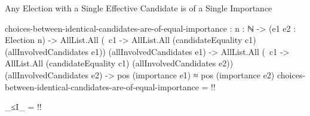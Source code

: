 \documentclass{beamer}
\begin{document}
\begin{frame}{Any Election with a Single Effective Candidate is of a Single Importance}
\begin{code}
choices-between-identical-candidates-are-of-equal-importance :
  {n : ℕ} ->
  (e1 e2 : Election {n}) ->
  AllList.All (\ c1 -> AllList.All (candidateEquality c1)
                                   (allInvolvedCandidates e1))
              (allInvolvedCandidates e1) ->
  AllList.All (\ c1 -> AllList.All (candidateEquality c1)
                                   (allInvolvedCandidates e2))
              (allInvolvedCandidates e2) ->
  pos (importance e1) ≈ pos (importance e2)
choices-between-identical-candidates-are-of-equal-importance =
  {!!}

_≤I_ = {!!}
\end{code}
\end{frame}
\end{document}

